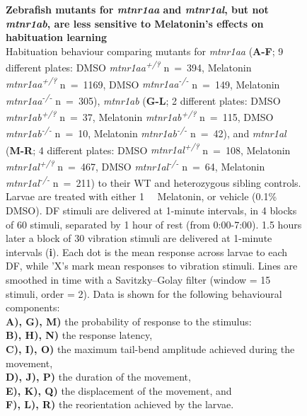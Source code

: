 \documentclass[9.5pt]{RandlettLab_elife}            %
\begin{document}
\begin{figure}
\begin{center}
\caption{\textbf{Zebrafish mutants for \emph{mtnr1aa} and \emph{mtnr1al}, but not \emph{mtnr1ab}, are less sensitive to Melatonin's effects on habituation learning}\\
Habituation behaviour comparing mutants for \emph{mtnr1aa} (\textbf{A-F}; 9 different plates: DMSO \emph{mtnr1aa\textsuperscript{+/?}} n~=~394, Melatonin \emph{mtnr1aa\textsuperscript{+/?}} n~=~1169, DMSO \emph{mtnr1aa\textsuperscript{-/-}} n~=~149, Melatonin \emph{mtnr1aa\textsuperscript{-/-}} n~=~305), \emph{mtnr1ab} (\textbf{G-L}; 2 different plates: DMSO \emph{mtnr1ab\textsuperscript{+/?}} n~=~37, Melatonin \emph{mtnr1ab\textsuperscript{+/?}} n~=~115, DMSO \emph{mtnr1ab\textsuperscript{-/-}} n~=~10, Melatonin \emph{mtnr1ab\textsuperscript{-/-}} n~=~42), and \emph{mtnr1al} (\textbf{M-R}; 4 different plates: DMSO \emph{mtnr1al\textsuperscript{+/?}} n~=~108, Melatonin \emph{mtnr1al\textsuperscript{+/?}} n~=~467, DMSO \emph{mtnr1al\textsuperscript{-/-}} n~=~64, Melatonin \emph{mtnr1al\textsuperscript{-/-}} n~=~211) to their WT and heterozygous sibling controls. Larvae are treated with either \SI{1}{\micro\Molar} Melatonin, or vehicle (0.1\% DMSO). 
DF stimuli are delivered at 1-minute intervals, in 4 blocks of 60 stimuli, separated by 1 hour of rest (from 0:00-7:00). 
1.5 hours later a block of 30 vibration stimuli are delivered at 1-minute intervals (\textbf{i}). 
Each dot is the mean response across larvae to each DF, while 'X's mark mean responses to vibration stimuli. Lines are smoothed in time with a Savitzky–Golay filter (window = 15 stimuli, order = 2). Data is shown for the following behavioural components:
\\ \textbf{A), G), M)} the probability of response to the stimulus: 
\\ \textbf{B), H), N)} the response latency,
\\ \textbf{C), I), O)} the maximum tail-bend amplitude achieved during the movement,
\\ \textbf{D), J), P)} the duration of the movement, 
\\ \textbf{E), K), Q)} the displacement of the movement, and 
\\ \textbf{F), L), R)} the reorientation achieved by the larvae.}

\label{fig:3}


\end{center}
\end{figure}
\end{document}
